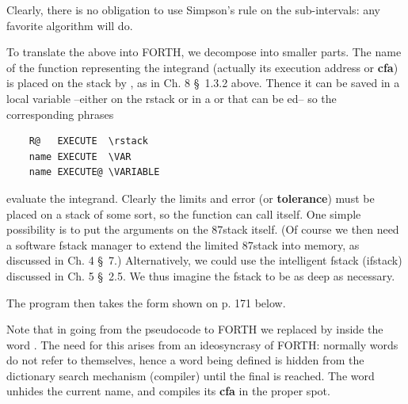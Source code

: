 Clearly, there is no obligation to use Simpson's rule on the sub-intervals: any favorite algorithm will do.

To translate the above into FORTH, we decompose into smaller parts. The name of the function representing the integrand (actually its execution address or \textbf{cfa}) is placed on the stack by , as in Ch. 8 \S\ 1.3.2 above. Thence it can be saved in a local variable --either on the rstack or in a  or  that can be ed-- so the corresponding phrases

\begin{lstlisting}
    R@   EXECUTE  \rstack
    name EXECUTE  \VAR
    name EXECUTE@ \VARIABLE
\end{lstlisting}

evaluate the integrand. Clearly the limits and error (or \textbf{tolerance}) must be placed on a stack of some sort, so the function can call itself. One simple possibility is to put the arguments on the 87stack itself. (Of course we then need a software fstack manager to extend the limited 87stack into memory, as discussed in Ch. 4 \S\ 7.) Alternatively, we could use the intelligent fstack (ifstack) discussed in Ch. 5 \S\ 2.5. We thus imagine the fstack to be as deep as necessary.

The program then takes the form shown on p. 171 below.

Note that in going from the pseudocode to FORTH we replaced  by  inside the word . The need for this arises from an ideosyncrasy of FORTH: normally words do not refer to themselves, hence a word being defined is hidden from the dictionary search mechanism (compiler) until the final \bc{;} is reached. The word  unhides the current name, and compiles its \textbf{cfa} in the proper spot.

